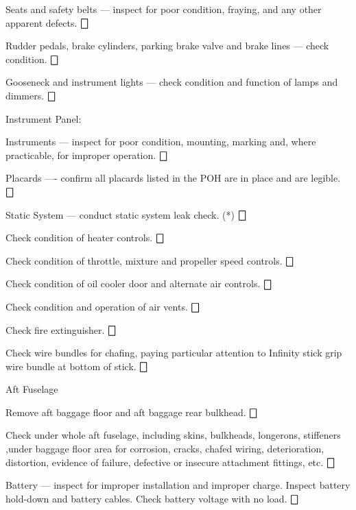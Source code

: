 \begin{enumerate*}
\begin{enumerate*}
		\item Seats and safety belts --- inspect for poor condition, fraying, and any other apparent defects. \dotfill $\bigbox$
		\item Rudder pedals, brake cylinders, parking brake valve and brake lines --- check condition. \dotfill $\bigbox$
		\item Gooseneck and instrument lights --- check condition and function of lamps and dimmers. \dotfill $\bigbox$
		\item Instrument Panel:
  	\begin{enumerate*}
  		\item Instruments --- inspect for poor condition, mounting, marking and, where practicable, for improper operation. \dotfill $\bigbox$
  		\item Placards ---- confirm all placards listed in the POH are in place and are legible. \dotfill $\bigbox$
  		\item Static System --- conduct static system leak check. (*) \dotfill $\bigbox$
      \end{enumerate*}
		\item Check condition of heater controls. \dotfill $\bigbox$
		\item Check condition of throttle, mixture and propeller speed controls. \dotfill $\bigbox$
		\item Check condition of oil cooler door and alternate air controls. \dotfill $\bigbox$
		\item Check condition and operation of air vents. \dotfill $\bigbox$
		\item Check fire extinguisher. \dotfill $\bigbox$
		\item Check wire bundles for chafing, paying particular attention to Infinity stick grip wire bundle at bottom of stick. \dotfill $\bigbox$
	\end{enumerate*}
	\item{Aft Fuselage} 
	\begin{enumerate*}
		\item Remove aft baggage floor and aft baggage rear bulkhead.  \dotfill $\bigbox$
		\item Check under whole aft fuselage, including skins, bulkheads, longerons, stiffeners ,under baggage floor area for corrosion, cracks, chafed wiring, deterioration, distortion, evidence of failure, defective or insecure attachment fittings, etc. \dotfill $\bigbox$
		\item Battery --- inspect for improper installation and improper charge.  Inspect battery hold-down and battery cables.  Check battery voltage with no load. \dotfill $\bigbox$

\end{enumerate*}
\end{enumerate*}
